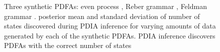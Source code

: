 \begin{figure}[htbp]
\caption{Three synthetic PDFAs:  even process \cite{Shalizi2004},  Reber grammar \cite{Reber1967},  Feldman grammar \cite{Feldman1966}.   posterior mean and standard deviation of number of states discovered during PDIA inference for varying amounts of data generated by each of the synthetic PDFAs.  PDIA inference discovers PDFAs with the correct number of states
\label{fig:synthetic_grammar_and_synth_results}}
\end{figure}